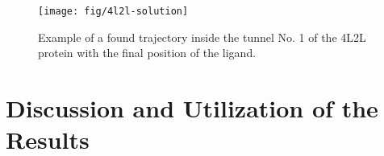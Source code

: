 \documentclass[usletter, 10pt, conference]{ieeeconf} %
\def\qrand{q_{rand}}
\def\smin{s_{min}}
\def\RA{A$_{1}$}
\def\RB{A$_{2}$}
\def\RC{A$_{1}^{*}$}
\begin{document}

\begin{figure}
\centering
\vskip -5pt
\texttt{[image: fig/4l2l-solution]}
\caption{\small
    \label{fig::inhibitor}Example of a found trajectory inside the tunnel No. 1 of the 4L2L protein with the final position of the ligand.
}
\end{figure}



\section{Discussion and Utilization of the Results}

\end{document}
